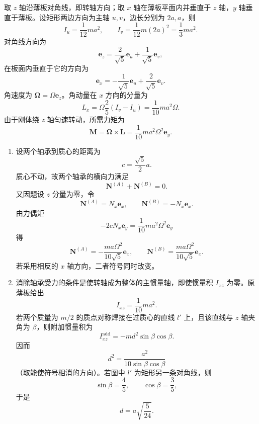 \begin{question}[旋转矩形薄板的轴承受力]
\begin{solution}
取 $z$ 轴沿薄板对角线，即转轴方向；取 $x$ 轴在薄板平面内并垂直于 $z$ 轴，$y$ 轴垂直于薄板。设矩形两边方向为主轴 $u,v$，边长分别为 $2a,a$，则
\[
  I_u=\frac1{12}ma^2,
  \qquad
  I_v=\frac1{12}m(2a)^2=\frac13ma^2.
\]
对角线方向为
\[
  \boldsymbol e_z=\frac{2}{\sqrt5}\boldsymbol e_u+\frac1{\sqrt5}\boldsymbol e_v,
\]
在板面内垂直于它的方向为
\[
  \boldsymbol e_x=-\frac1{\sqrt5}\boldsymbol e_u+\frac2{\sqrt5}\boldsymbol e_v.
\]
角速度为 $\boldsymbol\Omega=\Omega\boldsymbol e_z$。角动量在 $x$ 方向的分量为
\[
  L_x=\Omega\frac{2}{5}(I_v-I_u)=\frac1{10}ma^2\Omega.
\]
由于刚体绕 $z$ 轴匀速转动，所需力矩为
\[
  \boldsymbol M=\boldsymbol\Omega\times\boldsymbol L
  =\frac1{10}ma^2\Omega^2\boldsymbol e_y.
\]
\begin{enumerate}
  \item 设两个轴承到质心的距离为
  \[
    c=\frac{\sqrt5}{2}a.
  \]
  质心不动，故两个轴承的横向力满足
  \[
    \boldsymbol N^{(A)}+\boldsymbol N^{(B)}=0.
  \]
  又因题设 $z$ 分量为零，令
  \[
    \boldsymbol N^{(A)}=N_x\boldsymbol e_x,
    \qquad
    \boldsymbol N^{(B)}=-N_x\boldsymbol e_x.
  \]
  由力偶矩
  \[
    -2cN_x\boldsymbol e_y=\frac1{10}ma^2\Omega^2\boldsymbol e_y
  \]
  得
  \[
    \boxed{\boldsymbol N^{(A)}=-\frac{ma\Omega^2}{10\sqrt5}\boldsymbol e_x,
    \qquad
    \boldsymbol N^{(B)}=\frac{ma\Omega^2}{10\sqrt5}\boldsymbol e_x}.
  \]
  若采用相反的 $x$ 轴方向，二者符号同时改变。
  \item 消除轴承受力的条件是使转轴成为整体的主惯量轴，即使惯量积 $I_{xz}$ 为零。原薄板给出
  \[
    I_{xz}=\frac1{10}ma^2.
  \]
  若两个质量为 $m/2$ 的质点对称焊接在过质心的直线 $l'$ 上，且该直线与 $z$ 轴夹角为 $\beta$，则附加惯量积为
  \[
    I_{xz}^{\mathrm{add}}=-md^2\sin\beta\cos\beta.
  \]
  因而
  \[
    d^2=\frac{a^2}{10\sin\beta\cos\beta}
  \]
  （取能使符号相消的方向）。若图中 $l'$ 为矩形另一条对角线，则
  \[
    \sin\beta=\frac45,
    \qquad
    \cos\beta=\frac35,
  \]
  于是
  \[
    \boxed{d=a\sqrt{\frac5{24}}}.
  \]
\end{enumerate}
\end{solution}
\end{question}

